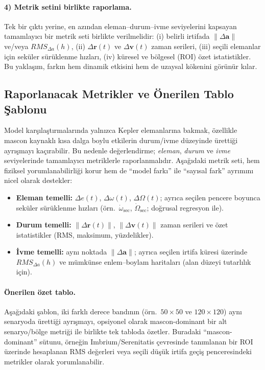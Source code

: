 \paragraph{4) Metrik setini birlikte raporlama.}
Tek bir çıktı yerine, en azından eleman--durum--ivme seviyelerini kapsayan tamamlayıcı bir metrik seti birlikte verilmelidir:
(i) belirli irtifada $\|\Delta\mathbf a\|$ ve/veya $RMS_{\Delta a}(h)$,
(ii) $\Delta\mathbf r(t)$ ve $\Delta\mathbf v(t)$ zaman serileri,
(iii) seçili elemanlar için seküler sürüklenme hızları,
(iv) küresel ve bölgesel (ROI) özet istatistikler. Bu yaklaşım, farkın hem dinamik etkisini hem de uzaysal kökenini görünür kılar.


\subsection{Raporlanacak Metrikler ve Önerilen Tablo Şablonu}
\label{subsec:report_metrics}

Model karşılaştırmalarında yalnızca Kepler elemanlarına bakmak, özellikle mascon kaynaklı kısa dalga boylu etkilerin
durum/ivme düzeyinde ürettiği ayrışmayı kaçırabilir. Bu nedenle değerlendirme; \emph{eleman}, \emph{durum} ve
\emph{ivme} seviyelerinde tamamlayıcı metriklerle raporlanmalıdır. Aşağıdaki metrik seti, hem fiziksel yorumlanabilirliği
korur hem de ``model farkı'' ile ``sayısal fark'' ayrımını nicel olarak destekler:

\begin{itemize}
\item \textbf{Eleman temelli:}
$\Delta e(t)$, $\Delta\omega(t)$, $\Delta\Omega(t)$; ayrıca seçilen pencere boyunca seküler sürüklenme hızları
(örn.\ $\dot{\omega}_{\text{sec}}$, $\dot{\Omega}_{\text{sec}}$; doğrusal regresyon ile).
\item \textbf{Durum temelli:}
$\|\Delta\mathbf r(t)\|$, $\|\Delta\mathbf v(t)\|$ zaman serileri ve özet istatistikler
(RMS, maksimum, yüzdelikler).
\item \textbf{İvme temelli:}
aynı noktada $\|\Delta\mathbf a\|$; ayrıca seçilen irtifa küresi üzerinde $RMS_{\Delta a}(h)$ ve mümkünse enlem--boylam
haritaları (alan düzeyi tutarlılık için).
\end{itemize}

\paragraph{Önerilen özet tablo.}
Aşağıdaki şablon, iki farklı derece bandının (örn.\ $50\times50$ ve $120\times120$) aynı senaryoda ürettiği ayrışmayı,
opsiyonel olarak mascon-dominant bir alt senaryo/bölge metriği ile birlikte tek tabloda özetler. Buradaki
``mascon-dominant'' sütunu, örneğin Imbrium/Serenitatis çevresinde tanımlanan bir ROI üzerinde hesaplanan RMS değerleri
veya seçili düşük irtifa geçiş penceresindeki metrikler olarak yorumlanabilir.

